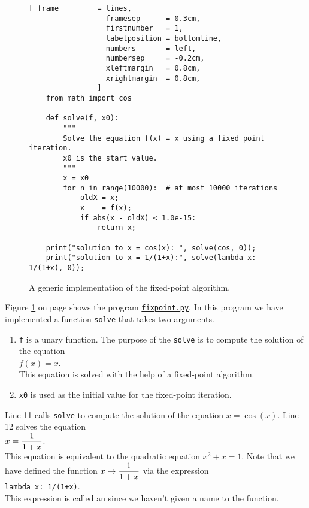 \begin{figure}[!ht]
\centering
\begin{Verbatim}[ frame         = lines, 
                  framesep      = 0.3cm, 
                  firstnumber   = 1,
                  labelposition = bottomline,
                  numbers       = left,
                  numbersep     = -0.2cm,
                  xleftmargin   = 0.8cm,
                  xrightmargin  = 0.8cm,
                ]
    from math import cos
    
    def solve(f, x0):
        """
        Solve the equation f(x) = x using a fixed point iteration.
        x0 is the start value.
        """
        x = x0
        for n in range(10000):  # at most 10000 iterations
            oldX = x;
            x    = f(x);
            if abs(x - oldX) < 1.0e-15: 
                return x;
    
    print("solution to x = cos(x): ", solve(cos, 0));
    print("solution to x = 1/(1+x):", solve(lambda x: 1/(1+x), 0));
\end{Verbatim}
\vspace*{-0.3cm}
\caption{A generic implementation of the fixed-point algorithm.}
\label{fig:fixpoint.py}
\end{figure}

Figure \ref{fig:fixpoint.py} on page \pageref{fig:fixpoint.py} shows the program
\href{https://github.com/karlstroetmann/Logic/blob/master/Python/fixpoint.py}{\texttt{fixpoint.py}}.
In this program we have implemented a function \texttt{solve} that takes two arguments.
\begin{enumerate}
\item \texttt{f} is a unary function.  The purpose of the \texttt{solve} is to compute the solution of the equation
      \\[0.2cm]
      \hspace*{1.3cm}
      $f(x) = x$.
      \\[0.2cm]
      This equation is solved with the help of a fixed-point algorithm.
\item \texttt{x0} is used as the initial value for the fixed-point iteration.
\end{enumerate}
Line 11 calls \texttt{solve} to compute the solution of the equation $x = \cos(x)$.
Line 12 solves the equation 
\\[0.2cm]
\hspace*{1.3cm}
$\displaystyle x = \frac{\displaystyle1}{\displaystyle 1+x}$. 
\\[0.2cm]
This equation is equivalent to the quadratic equation $x^2 + x = 1$.  Note that we have defined the function
 $\displaystyle x \mapsto \frac{1}{1+x}$ via the expression
 \\[0.2cm]
\hspace*{1.3cm}
\texttt{lambda x: 1/(1+x)}.
\\[0.2cm]
This expression is called an  since we haven't given a name to the function.  

